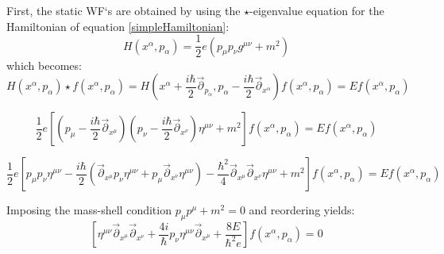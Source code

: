 \documentclass[a4paper,10pt]{article}
\numberwithin{equation}{section}
\newcommand{\parr}{\overset{\rightarrow}{\partial}}
\begin{document}
First, the static WF`s are obtained by using the $\star$-eigenvalue equation for the Hamiltonian of equation \ref{simpleHamiltonian}:
\begin{equation}
     H(x^\alpha,p_\alpha) = \frac{1}{2} e (p_\mu p _\nu g^{\mu\nu} + m^2)
\end{equation}
which becomes:
\begin{equation}
    H(x^\alpha,p_\alpha) \star f(x^\alpha,p_\alpha) = H \left(x^\alpha + \frac{i\hbar}{2} \parr_{p_\alpha}, p_\alpha - \frac{i\hbar}{2} \parr_{x^\alpha} \right) f \left(x^\alpha,p_\alpha \right) = E f\left(x^\alpha,p_\alpha \right)
\end{equation}

\begin{equation}
    \frac{1}{2}e \left[ \left( p_\mu - \frac{i\hbar}{2} \parr_{x^\mu} \right) \left( p_\nu - \frac{i\hbar}{2} \parr_{x^\nu} \right) \eta^{\mu\nu} + m^2 \right] f \left(x^\alpha,p_\alpha \right) = E f\left(x^\alpha,p_\alpha \right)
\end{equation}

\begin{equation}
    \frac{1}{2}e \left[ p_\mu p_\nu \eta^{\mu\nu} - \frac{i\hbar}{2} \left( \parr_{x^\mu} p_\nu \eta^{\mu\nu}  +  p_\mu \parr_{x^\nu}\eta^{\mu\nu}\right) - \frac{\hbar^2}{4}\parr_{x^\mu}\parr_{x^\nu} \eta^{\mu\nu} + m^2 \right] f \left(x^\alpha,p_\alpha \right) = E f\left(x^\alpha,p_\alpha \right)
    \label{THEequation}
\end{equation}


Imposing the mass-shell condition $p_\mu p^\mu + m^2 = 0$ and reordering yields:
\begin{equation}
     \left[ \eta^{\mu\nu}\parr_{x^\mu}\parr_{x^\nu}  + \frac{4i}{\hbar} p_\nu \eta^{\mu\nu} \parr_{x^\mu}  + \frac{8E}{\hbar^2 e} \right] f \left(x^\alpha,p_\alpha \right) =  0
    \label{THEequation}
\end{equation}
\end{document}
